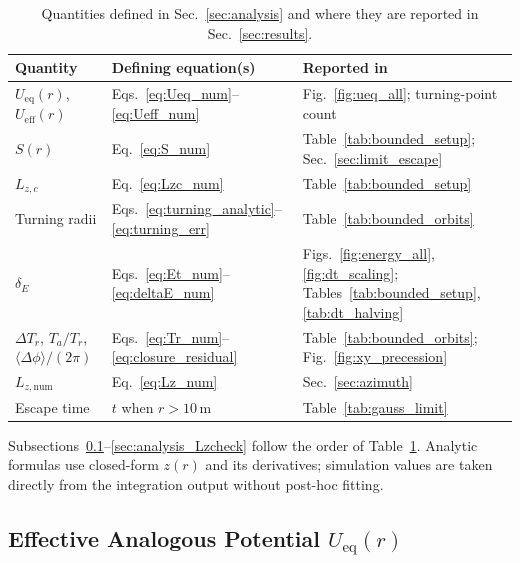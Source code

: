\documentclass[11pt,letterpaper]{article}
\begin{document}
\begin{table}[htbp]
    \centering
    \caption{Quantities defined in Sec.~\ref{sec:analysis} and where they are reported in Sec.~\ref{sec:results}.}
    \label{tab:analysis_map}
    \small
    \renewcommand{\arraystretch}{1.28}
    \setlength{\tabcolsep}{7pt}
    \begin{tabular}{@{}>{\raggedright\arraybackslash}p{3.2cm} >{\raggedright\arraybackslash}p{4.8cm} >{\raggedright\arraybackslash}p{4.6cm}@{}}
        \toprule
        Quantity & Defining equation(s) & Reported in \\
        \midrule
        $U_{\mathrm{eq}}(r)$, $U_{\mathrm{eff}}(r)$ & Eqs.~\eqref{eq:Ueq_num}--\eqref{eq:Ueff_num} & Fig.~\ref{fig:ueq_all}; turning-point count \\
        $S(r)$ & Eq.~\eqref{eq:S_num} & Table~\ref{tab:bounded_setup}; Sec.~\ref{sec:limit_escape} \\
        $L_{z,c}$ & Eq.~\eqref{eq:Lzc_num} & Table~\ref{tab:bounded_setup} \\
        Turning radii & Eqs.~\eqref{eq:turning_analytic}--\eqref{eq:turning_err} & Table~\ref{tab:bounded_orbits} \\
        $\delta_E$ & Eqs.~\eqref{eq:Et_num}--\eqref{eq:deltaE_num} & Figs.~\ref{fig:energy_all}, \ref{fig:dt_scaling}; Tables~\ref{tab:bounded_setup}, \ref{tab:dt_halving} \\
        $\Delta T_r$, $T_a/T_r$, $\langle\Delta\phi\rangle/(2\pi)$ & Eqs.~\eqref{eq:Tr_num}--\eqref{eq:closure_residual} & Table~\ref{tab:bounded_orbits}; Fig.~\ref{fig:xy_precession} \\
        $L_{z,\mathrm{num}}$ & Eq.~\eqref{eq:Lz_num} & Sec.~\ref{sec:azimuth} \\
        Escape time & $t$ when $r>10\,\mathrm{m}$ & Table~\ref{tab:gauss_limit} \\
        \bottomrule
    \end{tabular}
\end{table}

Subsections~\ref{sec:analysis_Ueq}--\ref{sec:analysis_Lzcheck} follow the order of Table~\ref{tab:analysis_map}. Analytic formulas use closed-form $z(r)$ and its derivatives; simulation values are taken directly from the integration output without post-hoc fitting.

\subsection{Effective Analogous Potential $U_{\mathrm{eq}}(r)$}
\label{sec:analysis_Ueq}
\end{document}
